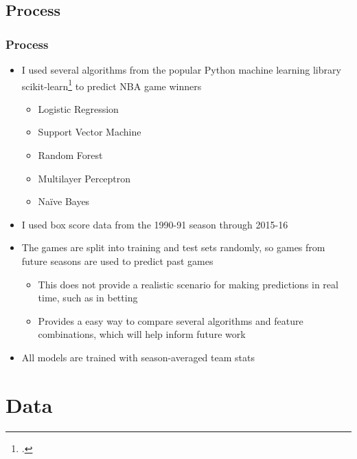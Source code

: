 \documentclass{beamer}
\begin{document}
\subsection{Process}
\begin{frame}
\frametitle{Process}
\begin{itemize}
    \item I used several algorithms from the popular Python machine learning library scikit-learn\footcite{scikit-learn} to predict NBA game winners
    \begin{itemize}
        \item Logistic Regression
        \item Support Vector Machine
        \item Random Forest
        \item Multilayer Perceptron
        \item Na{\"i}ve Bayes
    \end{itemize}
    \item I used box score data from the 1990-91 season through 2015-16
    \item The games are split into training and test sets randomly, so games from future seasons are used to predict past games
    \begin{itemize}
        \item This does not provide a realistic scenario for making predictions in real time, such as in betting
        \item Provides a easy way to compare several algorithms and feature combinations, which will help inform future work
    \end{itemize}
    \item All models are trained with season-averaged team stats
\end{itemize}
\end{frame}

\section{Data}
\end{document}
